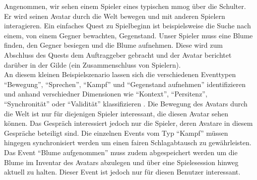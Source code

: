 \label{chap:grundlagen:szenario}
Angenommen, wir sehen einem Spieler eines typischen \ac{mmog} über die Schulter. Er wird seinen Avatar durch die Welt bewegen und mit anderen Spielern interagieren. Ein einfaches Quest zu Spielbeginn ist beispielsweise die Suche nach einem, von einem Gegner bewachten, Gegenstand. Unser Spieler muss eine Blume finden, den Gegner besiegen und die Blume aufnehmen. Diese wird zum Abschluss des Quests dem Auftraggeber gebracht und der Avatar berichtet darüber in der Gilde (ein Zusammenschluss von Spielern).\\
An diesem kleinen Beispielszenario lassen sich die verschiedenen Eventtypen \enquote{Bewegung'', ``Sprechen'', ``Kampf'' und ``Gegenstand aufnehmen'' identifizieren und anhand verschiedner Dimensionen wie ``Kontext'', ``Persitenz'', ``Synchronität'' oder ``Validität'' klassifizieren \cite{Fischer2010Event}. Die Bewegung des Avatars durch die Welt ist nur für diejenigen Spieler interessant, die diesen Avatar sehen können. Das Gespräch interessiert jedoch nur die Spieler, deren Avatare in diesem Gespräche beteiligt sind. Die einzelnen Events vom Typ ``Kampf'' müssen hingegen synchronisiert werden um einen fairen Schlagabtausch zu gewährleisten. Das Event ``Blume aufgenommen} muss zudem abgespeichert werden um die Blume im Inventar des Avatars abzulegen und über eine Spielesession hinweg aktuell zu halten. Dieser Event ist jedoch nur für diesen Benutzer interessant.



